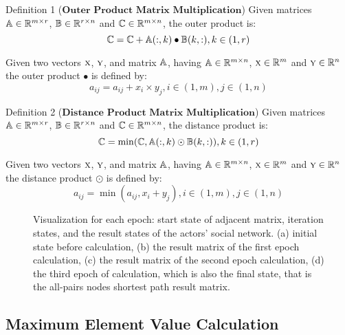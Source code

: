 \documentclass[review]{cvpr}
\begin{document}
Definition 1 ($\textbf{Outer Product Matrix Multiplication}$) Given matrices \(\Bbb A \in \Bbb R^{m\times r}\), \(\Bbb B \in \Bbb R^{r\times n}\) and \(\Bbb C \in \Bbb R^{m\times n}\), the outer product is:
\begin{equation}
\Bbb C = \Bbb C  + \Bbb A(:,k)\bullet \Bbb B(k,:) , k \in (1,r)
\end{equation}

Given two vectors \(\textsc x\), \(\textsc y\), and matrix \(\Bbb A\), having \(\Bbb A \in \Bbb R^{m\times n}\), \(\textsc x \in \Bbb R^{m}\) and \(\textsc y \in \Bbb R^{n}\) the outer product \(\bullet\) is defined by:
\begin{equation}
a_{ij} = a_{ij} + x_i \times  y_j, i \in (1,m), j \in (1,n)
\end{equation}

Definition 2 ($\textbf{Distance Product Matrix Multiplication}$) Given matrices \(\Bbb A \in \Bbb R^{m\times r}\), \(\Bbb B \in \Bbb R^{r\times n}\) and \(\Bbb C \in \Bbb R^{m\times n}\), the distance product is:
\begin{equation}
  \Bbb C = \min(\Bbb C, \Bbb A(:,k)\odot \Bbb B(k,:)) , k \in (1,r)
\end{equation}

Given two vectors \(\textsc x\), \(\textsc y\), and matrix \(\Bbb A\), having \(\Bbb A \in \Bbb R^{m\times n}\), \(\textsc x \in \Bbb R^{m}\) and \(\textsc y \in \Bbb R^{n}\) the distance product \(\odot\) is defined by:
\begin{equation}
a_{ij} = \min(a_{ij} , x_i + y_j), i \in (1,m), j \in (1,n)
\end{equation}
\begin{figure*}
\begin{center}
\end{center}
   \caption{Visualization for each epoch: start state of adjacent matrix, iteration states, and the result states of the actors' social network.
   (a) initial state before calculation,
   (b) the result matrix of the first epoch calculation,
   (c) the result matrix of the second epoch calculation,
   (d) the third epoch of calculation, which is also the final state, that is the all-pairs nodes shortest path result matrix.}
\label{fig:short}
\end{figure*}


\subsection{Maximum Element Value Calculation}
\end{document}
